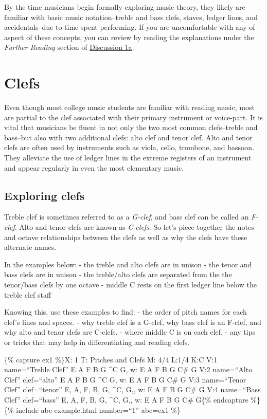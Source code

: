 \documentclass{book}
\begin{document}
By the time musicians begin formally exploring music theory, they likely are
familiar with basic music notation--treble and bass clefs, staves, ledger
lines, and accidentals--due to time spent performing. If you are uncomfortable
with any of aspect of these concepts, you can review by reading the
explanations under the \emph{Further Reading} section of
\href{01-pitches-clefs/a2-pitchesclefs.html}{Discussion 1a}.

\hypertarget{clefs-1}{%
\section{Clefs}\label{clefs-1}}

Even though most college music students are familiar with reading music, most
are partial to the clef associated with their primary instrument or
voice-part. It is vital that musicians be fluent in not only the two most
common clefs--treble and bass--but also with two additional clefs: alto clef
and tenor clef. Alto and tenor clefs are often used by instruments such as
viola, cello, trombone, and bassoon. They alleviate the use of ledger lines in
the extreme registers of an instrument and appear regularly in even the most
elementary music.

\hypertarget{exploring-clefs}{%
\subsection{Exploring clefs}\label{exploring-clefs}}

Treble clef is sometimes referred to as a \emph{G-clef}, and bass clef can be
called an \emph{F-clef}. Alto and tenor clefs are known as \emph{C-clefs}. So
let's piece together the notes and octave relationships between the clefs as
well as why the clefs have these alternate names.

In the examples below: - the treble and alto clefs are in unison - the tenor
and bass clefs are in unison - the treble/alto clefs are separated from the
the tenor/bass clefs by one octave - middle C rests on the first ledger line
below the treble clef staff

Knowing this, use these examples to find: - the order of pitch names for each
clef's lines and spaces. - why treble clef is a G-clef, why bass clef is an
F-clef, and why alto and tenor clefs are C-clefs. - where middle C is on each
clef. - any tips or tricks that may help in differentiating and reading clefs.

\{\% capture ex1 \%\}X: 1 T: Pitches and Clefs M: 4/4 L:1/4 K:C V:1
name=``Treble Clef'' E A F B G \^{}C G,\textbar{]} w: E A F B G C\# G V:2
name=``Alto Clef'' clef=``alto'' E A F B G \^{}C G,\textbar{]} w: E A F B G
C\# G V:3 name=``Tenor Clef'' clef=``tenor'' E, A, F, B, G, \^{}C,
G,,\textbar{]} w: E A F B G C\# G V:4 name=``Bass Clef'' clef=``bass'' E, A,
F, B, G, \^{}C, G,,\textbar{]} w: E A F B G C\# G\{\% endcapture \%\} \{\%
include abc-example.html number=``1'' abc=ex1 \%\}
\end{document}
